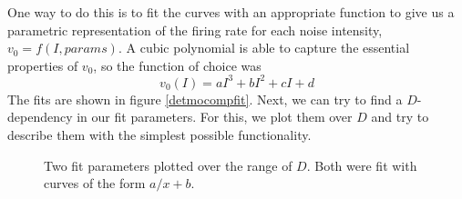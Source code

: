 \documentclass[12pt,a4paper]{article}
\begin{document}
One way to do this is to fit the curves with an appropriate function to give us a parametric representation of the firing rate for each noise intensity, $v_0=f(I,params)$. A cubic polynomial is able to capture the essential properties of $v_0$, so the function of choice was 
\begin{equation}
v_0(I)=aI^3+bI^2+cI+d
\end{equation}
The fits are shown in figure \ref{detmocompfit}.
Next, we can try to find a $D$-dependency in our fit parameters. For this, we plot them over $D$ and try to describe them with the simplest possible functionality.
\begin{figure}[H]
	\hspace*{-0.5cm}
	\caption{Two fit parameters plotted over the range of $D$. Both were fit with curves of the form $a/x+b$.}
\end{figure}  
\end{document}
